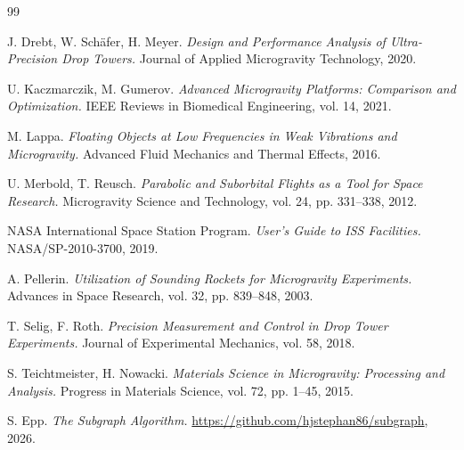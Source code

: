 ﻿\documentclass[a4paper,12pt]{article}
\theoremstyle{definition}
\begin{document}
\begin{thebibliography}{99}

J. Drebt, W. Sch\"afer, H. Meyer. \emph{Design and Performance Analysis of Ultra-Precision Drop Towers.} Journal of Applied Microgravity Technology, 2020.

U. Kaczmarczik, M. Gumerov. \emph{Advanced Microgravity Platforms: Comparison and Optimization.} IEEE Reviews in Biomedical Engineering, vol. 14, 2021.

M. Lappa. \emph{Floating Objects at Low Frequencies in Weak Vibrations and Microgravity.} Advanced Fluid Mechanics and Thermal Effects, 2016.

U. Merbold, T. Reusch. \emph{Parabolic and Suborbital Flights as a Tool for Space Research.} Microgravity Science and Technology, vol. 24, pp. 331--338, 2012.

NASA International Space Station Program. \emph{User's Guide to ISS Facilities.} NASA/SP-2010-3700, 2019.

A. Pellerin. \emph{Utilization of Sounding Rockets for Microgravity Experiments.} Advances in Space Research, vol. 32, pp. 839--848, 2003.

T. Selig, F. Roth. \emph{Precision Measurement and Control in Drop Tower Experiments.} Journal of Experimental Mechanics, vol. 58, 2018.

S. Teichtmeister, H. Nowacki. \emph{Materials Science in Microgravity: Processing and Analysis.} Progress in Materials Science, vol. 72, pp. 1--45, 2015.

S. Epp. \emph{The Subgraph Algorithm.} \url{https://github.com/hjstephan86/subgraph}, 2026.

\end{thebibliography}
\end{document}

